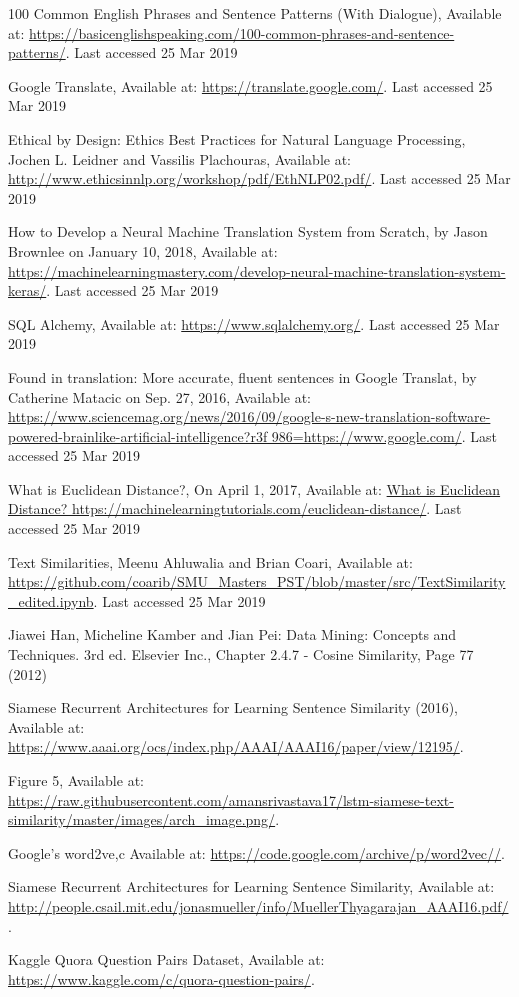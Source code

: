 \documentclass[runningheads]{llncs}
\begin{document}
\begin{thebibliography}{8}
	100 Common English Phrases and Sentence Patterns (With Dialogue), Available at: \url{https://basicenglishspeaking.com/100-common-phrases-and-sentence-patterns/}.  Last accessed 25 Mar 2019

	Google Translate, Available at: \url{https://translate.google.com/}.  Last accessed 25 Mar 2019

	Ethical by Design: Ethics Best Practices for Natural Language Processing, Jochen L. Leidner and Vassilis Plachouras, Available at: \url{http://www.ethicsinnlp.org/workshop/pdf/EthNLP02.pdf/}.  Last accessed 25 Mar 2019

How to Develop a Neural Machine Translation System from Scratch, by Jason Brownlee on January 10, 2018, Available at: \url{https://machinelearningmastery.com/develop-neural-machine-translation-system-keras/}.  Last accessed 25 Mar 2019

SQL Alchemy, Available at: \url{https://www.sqlalchemy.org/}.  Last accessed 25 Mar 2019

Found in translation: More accurate, fluent sentences in Google Translat, by Catherine Matacic on Sep. 27, 2016,  Available at:  \url{https://www.sciencemag.org/news/2016/09/google-s-new-translation-software-powered-brainlike-artificial-intelligence?r3f 986=https://www.google.com/}.  Last accessed 25 Mar 2019

What is Euclidean Distance?, On April 1, 2017, Available at:  \url{What is Euclidean Distance?  https://machinelearningtutorials.com/euclidean-distance/}.  Last accessed 25 Mar 2019

Text Similarities, Meenu Ahluwalia and Brian Coari, Available at:  \url{https://github.com/coarib/SMU_Masters_PST/blob/master/src/TextSimilarity_edited.ipynb}.  Last accessed 25 Mar 2019

Jiawei Han, Micheline Kamber and Jian Pei: Data Mining: Concepts and Techniques. 3rd ed. Elsevier Inc., Chapter 2.4.7 - Cosine Similarity, Page 77 (2012)

Siamese Recurrent Architectures for Learning Sentence Similarity (2016), Available at:
\url{https://www.aaai.org/ocs/index.php/AAAI/AAAI16/paper/view/12195/}.

Figure 5, Available at: \url{https://raw.githubusercontent.com/amansrivastava17/lstm-siamese-text-similarity/master/images/arch_image.png/}.

Google's word2ve,c Available at:
\url{https://code.google.com/archive/p/word2vec//}.

Siamese Recurrent Architectures for Learning Sentence Similarity, Available at:
\url{http://people.csail.mit.edu/jonasmueller/info/MuellerThyagarajan_AAAI16.pdf/}.

Kaggle Quora Question Pairs  Dataset, Available at: 
\url{https://www.kaggle.com/c/quora-question-pairs/}.


\end{thebibliography}
\end{document}
